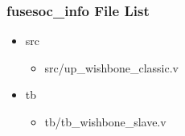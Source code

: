 \subsubsection{fusesoc\_info File List}
\begin{itemize}
\item src
	\begin{itemize}
	\item src/up\_wishbone\_classic.v
	\end{itemize}
\item tb
	\begin{itemize}
	\item tb/tb\_wishbone\_slave.v
	\end{itemize}
\end{itemize}
